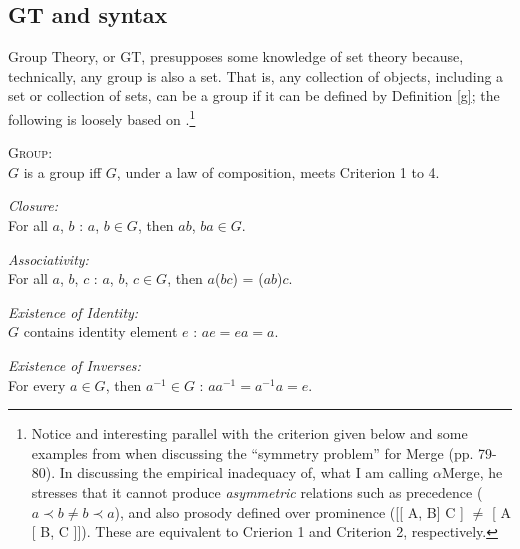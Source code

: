 \documentclass[11pt,twoside]{article}
\begin{document}
\subsection{GT and syntax}\label{gtsyn:sub}
Group Theory, or GT, presupposes some knowledge of set theory because, technically, any group is also a set. That is, any collection of objects, including a set or collection of sets, can be a group if it can be defined by Definition \ref{g}; the following is loosely based on \cite{rosen:1995}.\footnote{Notice and interesting parallel with the criterion given below and some examples from \cite{boeckx08bare} when discussing the ``symmetry problem'' for Merge (pp. 79-80). In discussing the empirical inadequacy of, what I am calling $\alpha$Merge, he stresses that it cannot produce \textsl{asymmetric} relations such as precedence ($a \prec b \neq b \prec a$), and also prosody defined over prominence ([[ A, B] C ] $\neq$ [ A [ B, C ]]). These are equivalent to Crierion 1 and Criterion 2, respectively.}

\begin{definition}
\textsc{Group:}\\
$G$ is a group iff $G$, under a law of composition, meets Criterion 1 to 4.\label{g} 
\end{definition}

\begin{criterion}
\textsl{Closure:}\\ For all $a$, $b$ : $a$, $b \in G$, then $ab$, $ba \in G$.
\end{criterion}

\begin{criterion}
\textsl{Associativity:}\\ For all $a$, $b$, $c$ : $a$, $b$, $c \in G$, then $a$($bc$) = ($ab$)$c$.
\end{criterion}

\begin{criterion}
\textsl{Existence of Identity:}\\ $G$ contains identity element $e$ : $ae = ea = a$.
\end{criterion}

\begin{criterion}
\textsl{Existence of Inverses:}\\ For every $a \in G$, then $a^{-1} \in G$ : $aa^{-1} = a^{-1}a = e$.
\end{criterion}
\end{document}
